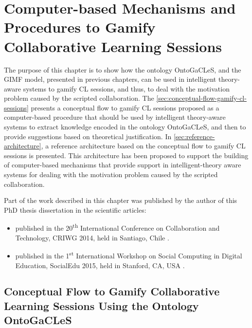 \chapter[Computer-based Mechanisms and Procedures to Gamify CL Sessions]{Computer-based Mechanisms and Procedures to Gamify Collaborative Learning Sessions}
\label{chapter:computer-based-mechanisms-procedures} 

The purpose of this chapter is to show how the ontology OntoGaCLeS, and the GIMF model, presented in previous chapters, can be used in intelligent theory-aware systems to gamify CL sessions, and thus, to deal with the motivation problem caused by the scripted collaboration. 
The \autoref{sec:conceptual-flow-gamify-cl-sessions} presents a conceptual flow to gamify CL sessions proposed as a computer-based procedure that should be used by intelligent theory-aware systems to extract knowledge encoded in the ontology OntoGaCLeS, and then to provide suggestions based on theoretical justification. 
In \autoref{sec:reference-architecture}, a reference architecture based on the conceptual flow to gamify CL sessions is presented. This architecture has been proposed to support the building of computer-based mechanisms that provide support in intelligent-theory aware systems for dealing with the motivation problem caused by the scripted collaboration.

Part of the work described in this chapter was published by the author of this PhD thesis dissertation in the scientific articles:

\begin{itemize}
\item
{} published in the 20\textsuperscript{th} International Conference on Collaboration and Technology, CRIWG 2014, held in Santiago, Chile \cite{ChallcoMoreiraMizoguchiIsotani2014}.

\item
{} published in the 1\textsuperscript{st} International Workshop on Social Computing in Digital Education, SocialEdu 2015, held in Stanford, CA, USA \cite{ChallcoMizoguchiBittencourtIsotani2015}.
\end{itemize}

\section[Conceptual Flow to Gamify CL Sessions Using the Ontology OntoGaCLeS]{Conceptual Flow to Gamify Collaborative Learning Sessions Using the Ontology OntoGaCLeS}
\label{sec:conceptual-flow-gamify-cl-sessions}


